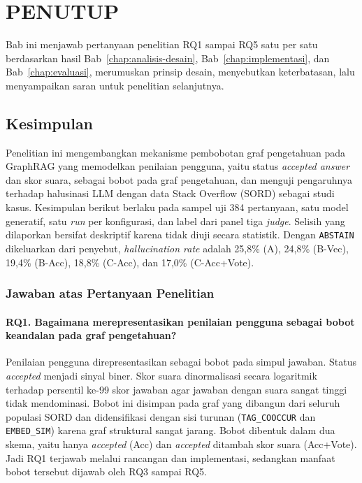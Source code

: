 \cleardoublepage
\chapter{PENUTUP}
\label{chap:penutup}

Bab ini menjawab pertanyaan penelitian RQ1 sampai RQ5 satu per satu berdasarkan hasil Bab~\ref{chap:analisis-desain}, Bab~\ref{chap:implementasi}, dan Bab~\ref{chap:evaluasi}, merumuskan prinsip desain, menyebutkan keterbatasan, lalu menyampaikan saran untuk penelitian selanjutnya.

\section{Kesimpulan}
\label{sec:kesimpulan}

Penelitian ini mengembangkan mekanisme pembobotan graf pengetahuan pada GraphRAG yang memodelkan penilaian pengguna, yaitu status \emph{accepted answer} dan skor suara, sebagai bobot pada graf pengetahuan, dan menguji pengaruhnya terhadap halusinasi LLM dengan data Stack Overflow (SORD) sebagai studi kasus. Kesimpulan berikut berlaku pada sampel uji 384 pertanyaan, satu model generatif, satu \emph{run} per konfigurasi, dan label dari panel tiga \emph{judge}. Selisih yang dilaporkan bersifat deskriptif karena tidak diuji secara statistik. Dengan \texttt{ABSTAIN} dikeluarkan dari penyebut, \emph{hallucination rate} adalah 25,8\% (A), 24,8\% (B-Vec), 19,4\% (B-Acc), 18,8\% (C-Acc), dan 17,0\% (C-Acc+Vote).

\subsection{Jawaban atas Pertanyaan Penelitian}
\label{subsec:jawaban-rq}

\subsubsection*{RQ1. Bagaimana merepresentasikan penilaian pengguna sebagai bobot keandalan pada graf pengetahuan?}

Penilaian pengguna direpresentasikan sebagai bobot pada simpul jawaban. Status \emph{accepted} menjadi sinyal biner. Skor suara dinormalisasi secara logaritmik terhadap persentil ke-99 skor jawaban agar jawaban dengan suara sangat tinggi tidak mendominasi. Bobot ini disimpan pada graf yang dibangun dari seluruh populasi SORD dan didensifikasi dengan sisi turunan (\texttt{TAG\_COOCCUR} dan \texttt{EMBED\_SIM}) karena graf struktural sangat jarang. Bobot dibentuk dalam dua skema, yaitu hanya \emph{accepted} (Acc) dan \emph{accepted} ditambah skor suara (Acc+Vote). Jadi RQ1 terjawab melalui rancangan dan implementasi, sedangkan manfaat bobot tersebut dijawab oleh RQ3 sampai RQ5.

